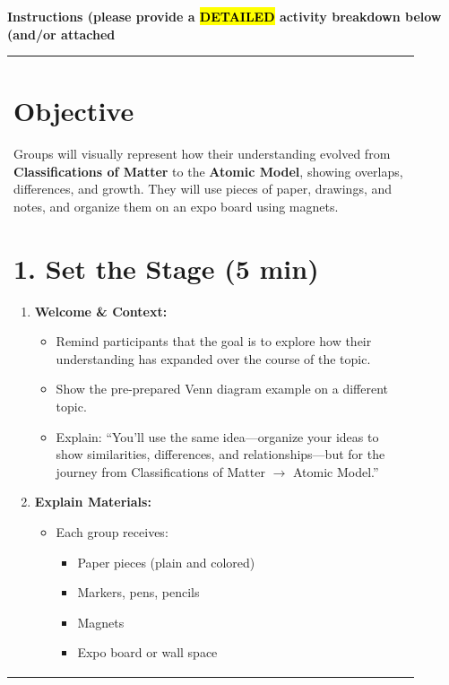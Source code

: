 \documentclass{article}
\begin{document}
\begin{flushleft}
\vspace{0.5cm}

\noindent
{\large \textbf{Instructions (please provide a \hl{DETAILED} activity breakdown below (and/or attached}} \\
\newpage

\begin{tabular}{|p{0.9\linewidth}|}
\hline
\section*{Objective}
Groups will visually represent how their understanding evolved from \textbf{Classifications of Matter} to the \textbf{Atomic Model}, showing overlaps, differences, and growth. They will use pieces of paper, drawings, and notes, and organize them on an expo board using magnets.

\section*{1. Set the Stage (5 min)}
\begin{enumerate}[label=\arabic*.]
    \item \textbf{Welcome \& Context:}
    \begin{itemize}
        \item Remind participants that the goal is to explore how their understanding has expanded over the course of the topic.
        \item Show the pre-prepared Venn diagram example on a different topic.
        \item Explain: ``You’ll use the same idea—organize your ideas to show similarities, differences, and relationships—but for the journey from Classifications of Matter $\rightarrow$ Atomic Model.''
    \end{itemize}
    \item \textbf{Explain Materials:}
    \begin{itemize}
        \item Each group receives:
        \begin{itemize}
            \item Paper pieces (plain and colored)
            \item Markers, pens, pencils
            \item Magnets
            \item Expo board or wall space
        \end{itemize}
    \end{itemize}
\end{enumerate}


\end{tabular}
\end{flushleft}
\end{document}
